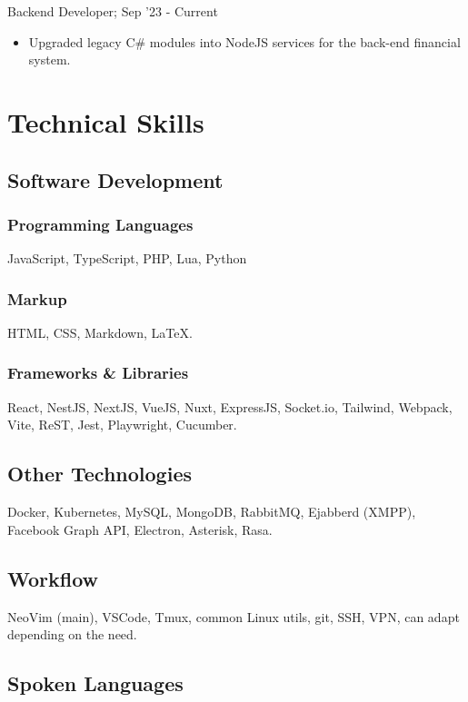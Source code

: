 \documentclass[letterpaper]{article}
\begin{document}
Backend Developer; Sep '23 - Current

\begin{itemize}
  \item Upgraded legacy C\# modules into NodeJS services for the back-end financial system.
\end{itemize}

\section{Technical Skills}

\subsection{Software Development}

\subsubsection{Programming Languages}

JavaScript, TypeScript, PHP, Lua, Python

\subsubsection{Markup}

HTML, CSS, Markdown, \LaTeX{}.

\subsubsection{Frameworks \& Libraries}

React, NestJS, NextJS, VueJS, Nuxt, ExpressJS, Socket.io, Tailwind, Webpack, Vite, ReST, Jest, Playwright, Cucumber.

\subsection{Other Technologies}

Docker, Kubernetes, MySQL, MongoDB, RabbitMQ, Ejabberd (XMPP), Facebook Graph API, Electron, Asterisk, Rasa.

\subsection{Workflow}

NeoVim (main), VSCode, Tmux, common Linux utils, git, SSH, VPN, can adapt depending on the need.

\subsection{Spoken Languages}
\end{document}
